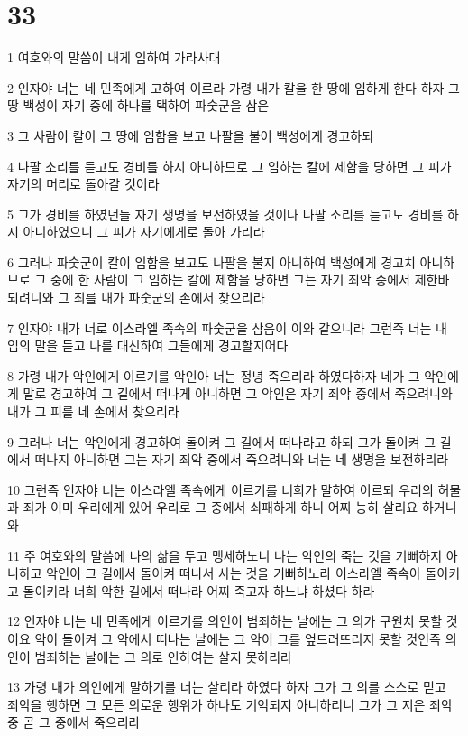 \chapter{33}

\par 1 여호와의 말씀이 내게 임하여 가라사대
\par 2 인자야 너는 네 민족에게 고하여 이르라 가령 내가 칼을 한 땅에 임하게 한다 하자 그 땅 백성이 자기 중에 하나를 택하여 파숫군을 삼은
\par 3 그 사람이 칼이 그 땅에 임함을 보고 나팔을 불어 백성에게 경고하되
\par 4 나팔 소리를 듣고도 경비를 하지 아니하므로 그 임하는 칼에 제함을 당하면 그 피가 자기의 머리로 돌아갈 것이라
\par 5 그가 경비를 하였던들 자기 생명을 보전하였을 것이나 나팔 소리를 듣고도 경비를 하지 아니하였으니 그 피가 자기에게로 돌아 가리라
\par 6 그러나 파숫군이 칼이 임함을 보고도 나팔을 불지 아니하여 백성에게 경고치 아니하므로 그 중에 한 사람이 그 임하는 칼에 제함을 당하면 그는 자기 죄악 중에서 제한바 되려니와 그 죄를 내가 파숫군의 손에서 찾으리라
\par 7 인자야 내가 너로 이스라엘 족속의 파숫군을 삼음이 이와 같으니라 그런즉 너는 내 입의 말을 듣고 나를 대신하여 그들에게 경고할지어다
\par 8 가령 내가 악인에게 이르기를 악인아 너는 정녕 죽으리라 하였다하자 네가 그 악인에게 말로 경고하여 그 길에서 떠나게 아니하면 그 악인은 자기 죄악 중에서 죽으려니와 내가 그 피를 네 손에서 찾으리라
\par 9 그러나 너는 악인에게 경고하여 돌이켜 그 길에서 떠나라고 하되 그가 돌이켜 그 길에서 떠나지 아니하면 그는 자기 죄악 중에서 죽으려니와 너는 네 생명을 보전하리라
\par 10 그런즉 인자야 너는 이스라엘 족속에게 이르기를 너희가 말하여 이르되 우리의 허물과 죄가 이미 우리에게 있어 우리로 그 중에서 쇠패하게 하니 어찌 능히 살리요 하거니와
\par 11 주 여호와의 말씀에 나의 삶을 두고 맹세하노니 나는 악인의 죽는 것을 기뻐하지 아니하고 악인이 그 길에서 돌이켜 떠나서 사는 것을 기뻐하노라 이스라엘 족속아 돌이키고 돌이키라 너희 악한 길에서 떠나라 어찌 죽고자 하느냐 하셨다 하라
\par 12 인자야 너는 네 민족에게 이르기를 의인이 범죄하는 날에는 그 의가 구원치 못할 것이요 악이 돌이켜 그 악에서 떠나는 날에는 그 악이 그를 엎드러뜨리지 못할 것인즉 의인이 범죄하는 날에는 그 의로 인하여는 살지 못하리라
\par 13 가령 내가 의인에게 말하기를 너는 살리라 하였다 하자 그가 그 의를 스스로 믿고 죄악을 행하면 그 모든 의로운 행위가 하나도 기억되지 아니하리니 그가 그 지은 죄악 중 곧 그 중에서 죽으리라
